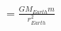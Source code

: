 \documentclass[preview]{standalone}
\begin{document}
\begin{align*}
= \frac{GM_{Earth}m}{r_{Earth}^2}
\end{align*}
\end{document}
